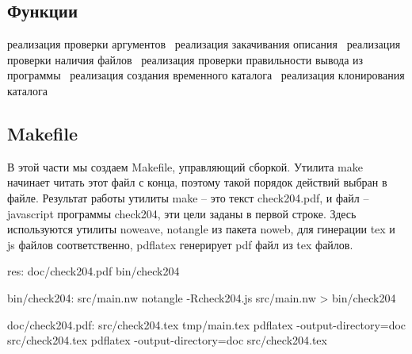 \subsection{Функции}
\nwenddocs{}\endmoddef\nwstartdeflinemarkup{}\nwenddeflinemarkup
\LA{}реализация проверки аргументов~{\nwtagstyle{}}\RA{}
\LA{}реализация закачивания описания~{\nwtagstyle{}}\RA{}
\LA{}реализация проверки наличия файлов~{\nwtagstyle{}}\RA{}
\LA{}реализация проверки правильности вывода из программы~{\nwtagstyle{}}\RA{}
\LA{}реализация создания временного каталога~{\nwtagstyle{}}\RA{}
\LA{}реализация клонирования каталога~{\nwtagstyle{}}\RA{}
\nwendcode{}\nwdocspar

\nwenddocs{}\subsection{Makefile}

В этой части
мы создаем Makefile, управляющий сборкой. 
Утилита make начинает читать этот файл с конца, поэтому
такой порядок действий выбран в файле.
Результат работы утилиты make -- это текст   check204.pdf,
и файл -- javascript программы check204, эти цели заданы в первой строке.
Здесь используются утилиты noweave, notangle из пакета noweb,
для гинерации tex и js файлов соответственно,
 pdflatex генерирует pdf файл из tex файлов. 

\nwenddocs{}\endmoddef\nwstartdeflinemarkup\nwenddeflinemarkup
res: doc/check204.pdf  bin/check204 


bin/check204: src/main.nw 
        notangle -Rcheck204.js src/main.nw > bin/check204




doc/check204.pdf: src/check204.tex  tmp/main.tex
        pdflatex -output-directory=doc src/check204.tex
        pdflatex -output-directory=doc src/check204.tex

